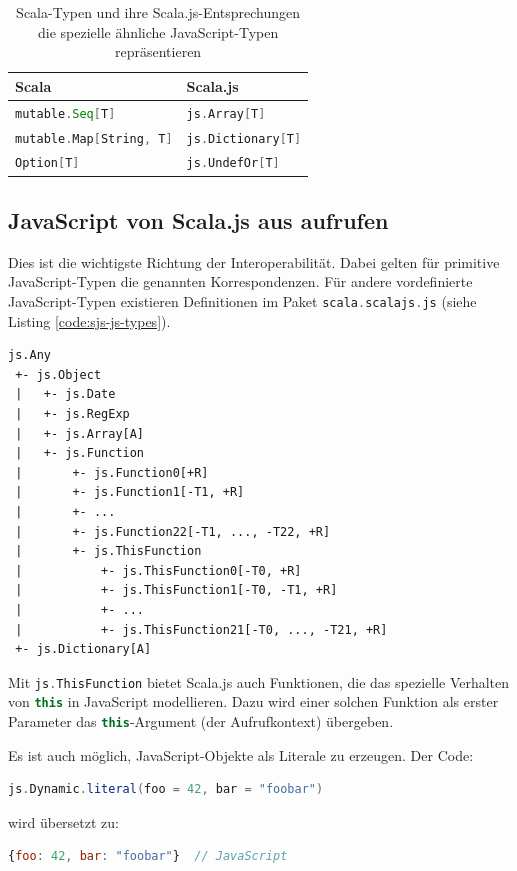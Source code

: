 \documentclass[a4paper, 12pt, hidelinks, listof=totoc, listoftables=totoc, bibliography=totoc]{scrreprt}
\newcommand{\scala}[1]{\lstinline[language=Scala, style=inline]|#1|}
\newcommand{\js}[1]{\lstinline[language=JavaScript, style=inline]|#1|}
\begin{document}
\begin{table}[!h]
\begin{tabular}{|l|l|}
\hline \textbf{Scala}                 & \textbf{Scala.js} \\ 
\hline \scala{mutable.Seq[T]}         & \scala{js.Array[T]} \\ 
\hline \scala{mutable.Map[String, T]} & \scala{js.Dictionary[T]} \\ 
\hline \scala{Option[T]}              & \scala{js.UndefOr[T]} \\ 
\hline 
\end{tabular}
\caption{Scala-Typen und ihre Scala.js-Entsprechungen die  spezielle ähnliche JavaScript-Typen repräsentieren \cite{scalajs.DJI}}
\label{table:type-non-correspondance}
\end{table}

\medskip


\subsection{JavaScript von Scala.js aus aufrufen}

Dies ist die wichtigste Richtung der Interoperabilität. Dabei gelten für primitive JavaScript-Typen die genannten Korrespondenzen. Für andere vordefinierte JavaScript-Typen existieren Definitionen im Paket \scala{scala.scalajs.js} (siehe Listing \ref{code:sjs-js-types}).

\begin{lstlisting}[caption={Scala.js-Typhierarchie für vordefinierte JavaScript-Typen. (Quelle: \cite{scalajs.DCJ})}, label={code:sjs-js-types}]
js.Any
 +- js.Object
 |   +- js.Date
 |   +- js.RegExp
 |   +- js.Array[A]
 |   +- js.Function
 |       +- js.Function0[+R]
 |       +- js.Function1[-T1, +R]
 |       +- ...
 |       +- js.Function22[-T1, ..., -T22, +R]
 |       +- js.ThisFunction
 |           +- js.ThisFunction0[-T0, +R]
 |           +- js.ThisFunction1[-T0, -T1, +R]
 |           +- ...
 |           +- js.ThisFunction21[-T0, ..., -T21, +R]
 +- js.Dictionary[A]
\end{lstlisting}

Mit \scala{js.ThisFunction} bietet Scala.js auch Funktionen, die das spezielle Verhalten von \js{this} in JavaScript modellieren. Dazu wird einer solchen Funktion als erster Parameter das \js{this}-Argument (der Aufrufkontext) übergeben.

Es ist auch möglich, JavaScript-Objekte als Literale zu erzeugen. Der Code:
\begin{lstlisting}[language=Scala, style=snippet]
js.Dynamic.literal(foo = 42, bar = "foobar")
\end{lstlisting}
wird übersetzt zu:
\begin{lstlisting}[language=JavaScript, style=snippet]
{foo: 42, bar: "foobar"}  // JavaScript
\end{lstlisting}
\end{document}
